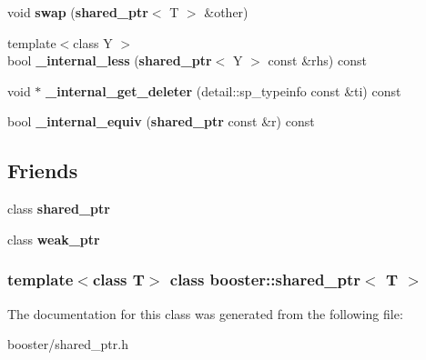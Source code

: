 \begin{DoxyCompactItemize}
\item 
void {\bfseries swap} ({\bf shared\-\_\-ptr}$<$ \-T $>$ \&other)\label{classbooster_1_1shared__ptr_af3cbdb878ddb9e4691bea4dfffb6ffd5}

\item 
{\footnotesize template$<$class Y $>$ }\\bool {\bfseries \-\_\-internal\-\_\-less} ({\bf shared\-\_\-ptr}$<$ \-Y $>$ const \&rhs) const \label{classbooster_1_1shared__ptr_a3b4f56f5e1c30ed8c2c7ff206b1ce3d2}

\item 
void $\ast$ {\bfseries \-\_\-internal\-\_\-get\-\_\-deleter} (detail\-::sp\-\_\-typeinfo const \&ti) const \label{classbooster_1_1shared__ptr_ae1f59324d5aae7890617e51ebdeee365}

\item 
bool {\bfseries \-\_\-internal\-\_\-equiv} ({\bf shared\-\_\-ptr} const \&r) const \label{classbooster_1_1shared__ptr_a7da6eb1a5ea8e47fcc091785c28cf3dc}

\end{DoxyCompactItemize}
\subsection*{\-Friends}
\begin{DoxyCompactItemize}
\item 
class {\bfseries shared\-\_\-ptr}\label{classbooster_1_1shared__ptr_a9a4da829475f0cf1809fc6ef555ffe06}

\item 
class {\bfseries weak\-\_\-ptr}\label{classbooster_1_1shared__ptr_a73fb185cab8b7bb5f231491bb497071c}

\end{DoxyCompactItemize}
\subsubsection*{template$<$class \-T$>$ class booster\-::shared\-\_\-ptr$<$ T $>$}



\-The documentation for this class was generated from the following file\-:\begin{DoxyCompactItemize}
\item 
booster/shared\-\_\-ptr.\-h\end{DoxyCompactItemize}
